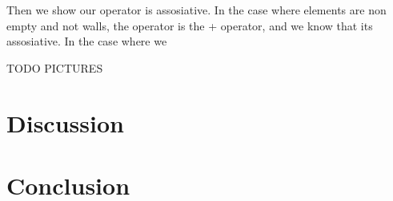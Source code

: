 \documentclass[11pt]{report}
\begin{document}
\\
\\
Then we show our operator is assosiative. In the case where elements are non empty and not walls, the operator is the + operator, and we know that its assosiative.
In the case where we



TODO PICTURES

\section{Discussion}

\section{Conclusion}
\end{document}
